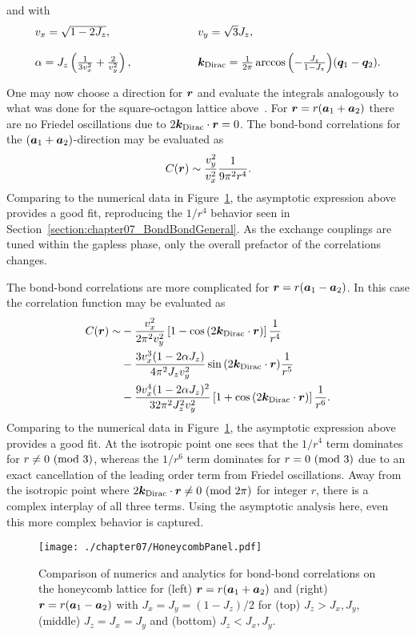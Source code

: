 %
and with
%
\begin{equation}
	\begin{matrix*}[l]
		v_x = \sqrt{1 - 2J_z},	& \qquad\qquad	& v_y = \sqrt{3} J_z,	\\
		\\
		\alpha = J_z \left(\frac{1}{3 v_x^2} + \frac{2}{v_y^2}\right),	& \qquad\qquad	& \bk_{\rm Dirac} = \frac{1}{2\pi} \arccos{\left(-\frac{J_z}{1 - J_z}\right)} (\bq_1 - \bq_2).
	\end{matrix*}
\end{equation}
%

One may now choose a direction for $\bm{r}$ and evaluate the integrals analogously to what was done for the square-octagon lattice above~\cite{Lighthill1958}.
For $\bm{r} = r(\bm{a}_1 + \bm{a}_2)$ there are no Friedel oscillations due to $2\bm{k}_{\rm Dirac}\cdot\bm{r} = 0$.
The bond-bond correlations for the $(\bm{a}_1 + \bm{a}_2)$-direction may be evaluated as
%
\begin{equation}
	C(\bm{r}) \sim \frac{v_y^2}{v_x^2}\frac{1}{9\pi^2 r^4}.
\end{equation}
%
Comparing to the numerical data in Figure~\ref{fig:chapter07_HoneycombPanel}, the asymptotic expression above provides a good fit, reproducing the $1/r^4$ behavior seen in Section~\ref{section:chapter07_BondBondGeneral}.
As the exchange couplings are tuned within the gapless phase, only the overall prefactor of the correlations changes.

The bond-bond correlations are more complicated for $\bm{r} = r(\bm{a}_1 - \bm{a}_2)$.
In this case the correlation function may be evaluated as
%
\begin{align}
	C(\bm{r}) \sim &-\frac{v_x^2}{2\pi^2 v_y^2} \left[1 - \cos{(2\bm{k}_{\rm Dirac}\cdot\bm{r})}\right] \frac{1}{r^4} \nonumber\\
	&-\frac{3 v_x^3 (1 - 2\alpha J_z)}{4\pi^2 J_z v_y^2} \sin{(2\bm{k}_{\rm Dirac}\cdot\bm{r})} \frac{1}{r^5} \nonumber\\
	&-\frac{9 v_x^4 (1 - 2\alpha J_z)^2}{32 \pi^2 J_z^2 v_y^2} \left[1 + \cos{(2\bm{k}_{\rm Dirac}\cdot\bm{r})}\right] \frac{1}{r^6}.
\end{align}
%
Comparing to the numerical data in Figure~\ref{fig:chapter07_HoneycombPanel}, the asymptotic expression above provides a good fit.
At the isotropic point one sees that the $1/r^4$ term dominates for $r \neq 0~({\rm mod}~3)$, whereas the $1/r^6$ term dominates for $r = 0~({\rm mod}~3)$ due to an exact cancellation of the leading order term from Friedel oscillations.
Away from the isotropic point where $2\bm{k}_{\rm Dirac}\cdot\bm{r} \neq 0~({\rm mod}~2\pi)$ for integer $r$, there is a complex interplay of all three terms.
Using the asymptotic analysis here, even this more complex behavior is captured.
%
\begin{figure}[tb]
	\centering
	\texttt{[image: ./chapter07/HoneycombPanel.pdf]}
	\caption{
		Comparison of numerics and analytics for bond-bond correlations on the honeycomb lattice for (left) $\bm{r} = r (\bm{a}_1 + \bm{a}_2)$ and (right) $\bm{r} = r (\bm{a}_1 - \bm{a}_2)$ with $J_x = J_y = (1 - J_z)/2$ for (top) $J_z > J_x, J_y$, (middle) $J_z = J_x = J_y$ and (bottom) $J_z < J_x, J_y$.
	}
	\label{fig:chapter07_HoneycombPanel}
\end{figure}
%


